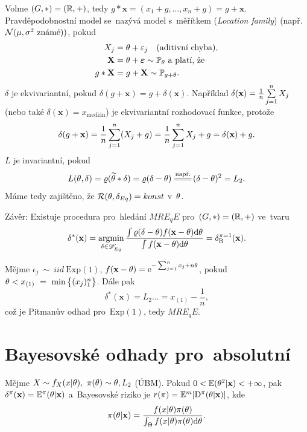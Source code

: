 \begin{example}
	Volme $(G,\ast)=(\mathbb{R},+)$, tedy $g\ast\textbf{x}=(x_1+g,...,x_n+g)=g+\textbf{x}$. Pravděpodobnostní model se~nazývá model s~měřítkem (\textit{Location family}) (např. $\mathcal{N}(\mu,\sigma^2 \text{ známé}))$, pokud
	\[
	\begin{split}
	X_j&=\theta+\varepsilon_j\quad(\text{aditivní chyba}),\\
	\textbf{X}&=\theta+\boldsymbol{\varepsilon}\sim\mathbb{P}_\theta\text{ a~platí, že }\\
	g\ast \textbf{X}&=g+\textbf{X}\sim \mathbb{P}_{g+\theta}.
	\end{split}
	\]
	$\delta$ je ekvivariantní, pokud $\delta(g+\textbf{x})=g+\delta(\textbf{x})$. Například $\delta(\textbf{x})=\frac{1}{n}\sum\limits_{j=1}^{n} X_j$ (nebo také $\delta(\textbf{x})=x_{\text{medián}}$) je ekvivariantní rozhodovací funkce, protože $$\delta(g+\textbf{x})=\frac{1}{n}\sum\limits_{j=1}^{n} (X_j+g)=\frac{1}{n}\sum\limits_{j=1}^{n} X_j + g=\delta(\textbf{x})+g.$$ $L$ je invariantní, pokud $$L(\t,\delta)=\rho(\widetilde{\t}\ast\delta)=\rho(\delta-\t)\equal{\text{např.}}(\delta-\t)^2=L_2.$$ Máme tedy zajištěno, že $\mathcal{R}(\theta,\delta_{Eq})=konst$ v~$\theta$.
	
	Závěr: Existuje procedura pro~hledání $MRE_qE$ pro~$(G,\ast)=(\mathbb{R},+)$ ve~tvaru
	$$ \delta^\ast(\textbf{x})=\mathop{\mathrm{argmin}}_{\delta\in\mathscr{D}' _{Eq}}\frac{\int\varrho(\delta-\theta)f(\textbf{x}-\theta)\mathrm{d}\theta}{\int f(\textbf{x}-\theta)\mathrm{d}\theta}=\delta_\mathrm{B}^{\pi=1}(\textbf{x}).$$
\end{example}
\begin{example}
	Mějme $\epsilon_j~\sim~iid~\mathrm{Exp}(1)$, $f(\textbf{x}-\theta)=\mathrm{e}^{-\sum_{j=1}^n x_j+n\theta}$, pokud $\theta< x_{(1)}~=~\min\big\{ (x_j)_1^n\big\}$. Dále pak
	$$ \delta^\ast(\textbf{x})\equal{L_2}...=x_{(1)}-\frac{1}{n},$$ což je Pitmanův odhad pro~$\mathrm{Exp}(1)$, tedy $MRE_qE$.
\end{example}

\chapter{Bayesovské odhady pro~absolutní}

\begin{remark}\label{veta1}
	Mějme $X\sim f_{X}(x|\theta),~\pi(\theta)\sim \theta,L_2$ (ÚBM). Pokud $0<\mathbb{E}(\theta^2|\textbf{x})<+\infty$, pak $\delta^\pi(\textbf{x})=\mathbb{E}^\pi(\theta|\textbf{x})$ a~Bayesovské riziko  je $r(\pi)=\mathbb{E}^m[\mathrm{D}^\pi(\theta|\textbf{x})]$, kde $$\pi(\theta|\textbf{x})=\frac{f(x|\theta)\pi(\theta)}{\int_\Theta f(x|\theta)\pi(\theta)\mathrm{d}\theta}.$$ 
\end{remark}

